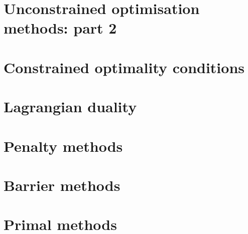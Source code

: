 \documentclass{bookest}
\begin{document}
	\chapter{Unconstrained optimisation methods: part 2}
	
	
	\chapter{Constrained optimality conditions}
		
	
	\chapter{Lagrangian duality}
		
	
	\chapter{Penalty methods}
	
	
	\chapter{Barrier methods}
	
	
	\chapter{Primal methods}
	
	
	
	 
	
\end{document}
